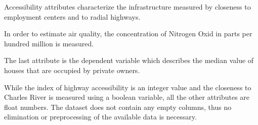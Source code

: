 Accessibility attributes characterize the infrastructure measured by closeness to employment centers and to radial highways. 

In order to estimate air quality, the concentration of Nitrogen Oxid in parts per hundred million is measured. 

The last attribute is the dependent variable which describes the median value of houses that are occupied by private owners. 

While the index of highway accessibility is an integer value and the closeness to Charles River is measured using a boolean variable, all the other attributes are float numbers. The dataset does not contain any empty columns, thus no elimination or preprocessing of the available data is necessary.